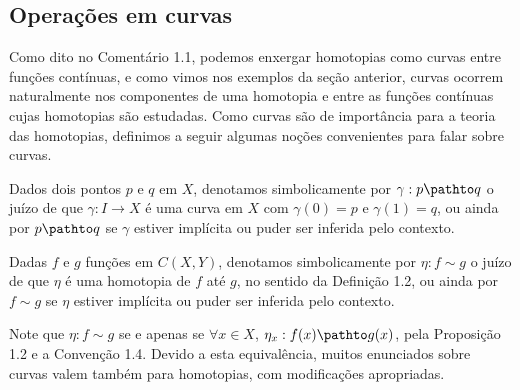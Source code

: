 \subsection{Operações em curvas}

Como dito no Comentário 1.1, podemos enxergar homotopias como curvas entre funções contínuas, e como vimos nos exemplos da seção anterior, curvas ocorrem naturalmente nos componentes de uma homotopia e entre as funções contínuas cujas homotopias são estudadas. Como curvas são de importância para a teoria das homotopias, definimos a seguir algumas noções convenientes para falar sobre curvas.%
\linebreak\vspace{-1.2em}

\vspace{0.5em}

\begin{convention}
    Dados dois pontos $p$ e $q$ em $X$, denotamos simbolicamente por $\gamma : p \pathto q$ o juízo de que $\gamma : I \to X$ é uma curva em $X$ com $\gamma(0) = p$ e $\gamma(1) = q$, ou ainda por $p \pathto q$ se $\gamma$ estiver implícita ou puder ser inferida pelo contexto.
    \qedalt
\end{convention}

\begin{convention}
    Dadas $f$ e $g$ funções em $C(X, Y)$, denotamos simbolicamente por $\eta : f \sim g$ o juízo de que $\eta$ é uma homotopia de $f$ até $g$, no sentido da Definição 1.2, ou ainda por $f \sim g$ se $\eta$ estiver implícita ou puder ser inferida pelo contexto.
    \qedalt
\end{convention}

\begin{remark}
    Note que $\eta : f \sim g$ se e apenas se $\forall x \in X$, $\eta_x : f(x) \pathto g(x)$, pela Proposição 1.2 e a Convenção 1.4. Devido a esta equivalência, muitos enunciados sobre curvas valem também para homotopias, com modificações apropriadas.
    \qedalt
\end{remark}